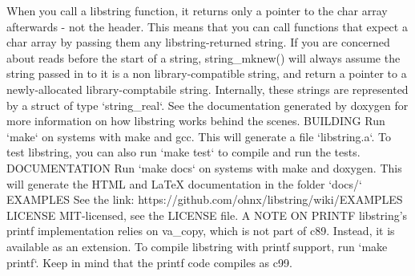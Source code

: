 \begin{DoxyCode}
\textcolor{stringliteral}{    When you call a libstring function, it returns only a pointer}
\textcolor{stringliteral}{    to the char array afterwards - not the header. This means that}
\textcolor{stringliteral}{    you can call functions that expect a char array by passing}
\textcolor{stringliteral}{    them any libstring-returned string.}
\textcolor{stringliteral}{}
\textcolor{stringliteral}{    If you are concerned about reads before the start of a string,}
\textcolor{stringliteral}{    string\_mknew() will always assume the string passed in to it}
\textcolor{stringliteral}{    is a non library-compatible string, and return a pointer to a}
\textcolor{stringliteral}{    newly-allocated library-comptabile string.}
\textcolor{stringliteral}{}
\textcolor{stringliteral}{    Internally, these strings are represented by a struct of type}
\textcolor{stringliteral}{    `string\_real`. See the documentation generated by doxygen for}
\textcolor{stringliteral}{    more information on how libstring works behind the scenes.}
\textcolor{stringliteral}{}
\textcolor{stringliteral}{BUILDING}
\textcolor{stringliteral}{    Run `make` on systems with make and gcc. This will generate a}
\textcolor{stringliteral}{    file `libstring.a`. To test libstring, you can also run}
\textcolor{stringliteral}{    `make test` to compile and run the tests.}
\textcolor{stringliteral}{}
\textcolor{stringliteral}{DOCUMENTATION}
\textcolor{stringliteral}{    Run `make docs` on systems with make and doxygen. This will}
\textcolor{stringliteral}{    generate the HTML and LaTeX documentation in the folder `docs/`}
\textcolor{stringliteral}{}
\textcolor{stringliteral}{EXAMPLES}
\textcolor{stringliteral}{    See the link: https://github.com/ohnx/libstring/wiki/EXAMPLES}
\textcolor{stringliteral}{}
\textcolor{stringliteral}{LICENSE}
\textcolor{stringliteral}{    MIT-licensed, see the LICENSE file.}
\textcolor{stringliteral}{}
\textcolor{stringliteral}{A NOTE ON PRINTF}
\textcolor{stringliteral}{    libstring'}s printf implementation relies on va\_copy, which
    is not part of c89. Instead, it is available as an extension.
    To compile libstring with printf support, run `make printf`.
    Keep in mind that the printf code compiles as c99.
\end{DoxyCode}
 